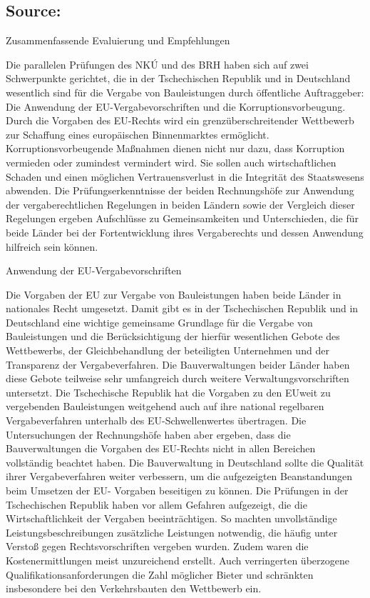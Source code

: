 \documentclass[10pt]{article}
\begin{document}
\subsection*{Source:}



Zusammenfassende Evaluierung und Empfehlungen

Die parallelen Prüfungen des NKÚ und des BRH haben sich auf zwei Schwerpunkte gerichtet, die in der Tschechischen Republik und in Deutschland wesentlich sind für die Vergabe von Bauleistungen durch öffentliche Auftraggeber: Die Anwendung der EU-Vergabevorschriften und die Korruptionsvorbeugung.
Durch die Vorgaben des EU-Rechts wird ein grenzüberschreitender Wettbewerb zur Schaffung eines europäischen Binnenmarktes ermöglicht.
Korruptionsvorbeugende Maßnahmen dienen nicht nur dazu, dass Korruption vermieden oder zumindest vermindert wird. Sie sollen auch wirtschaftlichen Schaden und einen möglichen Vertrauensverlust in die Integrität des Staatswesens abwenden.
Die Prüfungserkenntnisse der beiden Rechnungshöfe zur Anwendung der vergaberechtlichen Regelungen in beiden Ländern sowie der Vergleich dieser Regelungen ergeben Aufschlüsse zu Gemeinsamkeiten und Unterschieden, die für beide Länder bei der Fortentwicklung ihres Vergaberechts und dessen Anwendung hilfreich sein können.


Anwendung der EU-Vergabevorschriften

Die Vorgaben der EU zur Vergabe von Bauleistungen haben beide Länder in nationales Recht umgesetzt.
Damit gibt es in der Tschechischen Republik und in Deutschland eine wichtige gemeinsame Grundlage für die Vergabe von Bauleistungen und die Berücksichtigung der hierfür wesentlichen Gebote des Wettbewerbs, der Gleichbehandlung der beteiligten Unternehmen und der Transparenz der Vergabeverfahren.
Die Bauverwaltungen beider Länder haben diese Gebote teilweise sehr umfangreich durch weitere Verwaltungsvorschriften untersetzt.
Die Tschechische Republik hat die Vorgaben zu den EUweit zu vergebenden Bauleistungen weitgehend auch auf ihre national regelbaren Vergabeverfahren unterhalb des EU-Schwellenwertes übertragen.
Die Untersuchungen der Rechnungshöfe haben aber ergeben, dass die Bauverwaltungen die Vorgaben des EU-Rechts nicht in allen Bereichen vollständig beachtet haben.
Die Bauverwaltung in Deutschland sollte die Qualität ihrer Vergabeverfahren weiter verbessern, um die aufgezeigten Beanstandungen beim Umsetzen der EU- Vorgaben beseitigen zu können.
Die Prüfungen in der Tschechischen Republik haben vor allem Gefahren aufgezeigt, die die Wirtschaftlichkeit der Vergaben beeinträchtigen.
So machten unvollständige Leistungsbeschreibungen zusätzliche Leistungen notwendig, die häufig unter Verstoß gegen Rechtsvorschriften vergeben wurden.  Zudem waren die Kostenermittlungen meist unzureichend erstellt.  Auch verringerten überzogene Qualifikationsanforderungen die Zahl möglicher Bieter und schränkten insbesondere bei den Verkehrsbauten den Wettbewerb ein.
\end{document}
